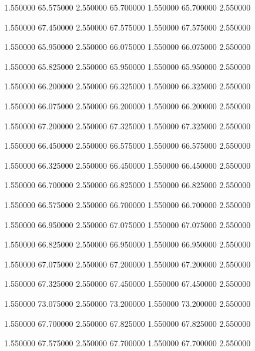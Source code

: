  {1.550000} {65.575000} {2.550000} {65.700000} {1.550000} {65.700000} {2.550000}

 {1.550000} {67.450000} {2.550000} {67.575000} {1.550000} {67.575000} {2.550000}

 {1.550000} {65.950000} {2.550000} {66.075000} {1.550000} {66.075000} {2.550000}

 {1.550000} {65.825000} {2.550000} {65.950000} {1.550000} {65.950000} {2.550000}

 {1.550000} {66.200000} {2.550000} {66.325000} {1.550000} {66.325000} {2.550000}

 {1.550000} {66.075000} {2.550000} {66.200000} {1.550000} {66.200000} {2.550000}

 {1.550000} {67.200000} {2.550000} {67.325000} {1.550000} {67.325000} {2.550000}

 {1.550000} {66.450000} {2.550000} {66.575000} {1.550000} {66.575000} {2.550000}

 {1.550000} {66.325000} {2.550000} {66.450000} {1.550000} {66.450000} {2.550000}

 {1.550000} {66.700000} {2.550000} {66.825000} {1.550000} {66.825000} {2.550000}

 {1.550000} {66.575000} {2.550000} {66.700000} {1.550000} {66.700000} {2.550000}

 {1.550000} {66.950000} {2.550000} {67.075000} {1.550000} {67.075000} {2.550000}

 {1.550000} {66.825000} {2.550000} {66.950000} {1.550000} {66.950000} {2.550000}

 {1.550000} {67.075000} {2.550000} {67.200000} {1.550000} {67.200000} {2.550000}

 {1.550000} {67.325000} {2.550000} {67.450000} {1.550000} {67.450000} {2.550000}

 {1.550000} {73.075000} {2.550000} {73.200000} {1.550000} {73.200000} {2.550000}

 {1.550000} {67.700000} {2.550000} {67.825000} {1.550000} {67.825000} {2.550000}

 {1.550000} {67.575000} {2.550000} {67.700000} {1.550000} {67.700000} {2.550000}

